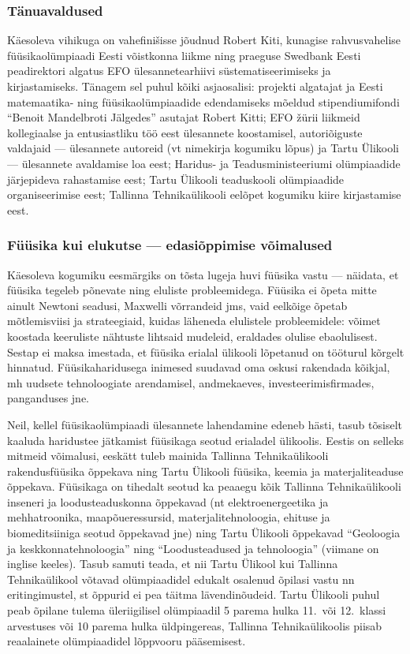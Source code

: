 \documentclass[11pt, twoside]{article}
\begin{document}
{{\subsubsection*{Tänuavaldused}
Käesoleva vihikuga on vahefinišisse jõudnud Robert Kiti, kunagise rahvusvahelise
füüsikaolümpiaadi Eesti võistkonna liikme ning
praeguse Swedbank Eesti peadirektori algatus EFO
ülesannetearhiivi süstematiseerimiseks ja kirjastamiseks.
Tänagem sel puhul kõiki asjaosalisi: projekti algatajat ja Eesti matemaatika- ning
füüsikaolümpiaadide edendamiseks mõeldud stipendiumifondi ``Benoit Mandelbroti Jälgedes'' asutajat Robert Kitti; EFO žürii liikmeid kollegiaalse ja entusiastliku töö eest ülesannete koostamisel,
autoriõiguste valdajaid --- ülesannete autoreid (vt nimekirja kogumiku lõpus) ja Tartu Ülikooli ---  ülesannete avaldamise loa eest;
Haridus- ja Teadusministeeriumi olümpiaadide järjepideva rahastamise eest; Tartu Ülikooli teaduskooli
olümpiaadide organiseerimise eest; Tallinna Tehnikaülikooli eelõpet
kogumiku kiire kirjastamise eest.

\subsubsection*{Füüsika kui elukutse --- edasiõppimise võimalused}
Käesoleva kogumiku eesmärgiks on tõsta lugeja huvi füüsika vastu --- näidata, et füüsika tegeleb põnevate ning
eluliste probleemidega. Füüsika ei õpeta mitte ainult Newtoni seadusi, Maxwelli võrrandeid jms, vaid eelkõige
õpetab mõtlemisviisi ja strateegiaid, kuidas läheneda elulistele probleemidele: võimet koostada keeruliste nähtuste
lihtsaid mudeleid, eraldades olulise ebaolulisest. Sestap ei maksa imestada, et
füüsika erialal ülikooli lõpetanud on tööturul kõrgelt hinnatud.
Füüsikaharidusega inimesed suudavad oma oskusi rakendada kõikjal, mh uudsete tehnoloogiate
arendamisel, andmekaeves, investeerimisfirmades, panganduses jne.

Neil, kellel füüsikaolümpiaadi ülesannete lahendamine edeneb hästi, tasub tõsiselt kaaluda haridustee jätkamist
füüsikaga seotud erialadel ülikoolis. Eestis on selleks mitmeid võimalusi, eeskätt tuleb mainida
{Tallinna Tehnikaülikooli rakendusfüüsika õppekava ning Tartu Ülikooli füüsika, keemia ja materjaliteaduse õppekava}.
Füüsikaga on tihedalt seotud ka peaaegu kõik
Tallinna Tehnikaülikooli inseneri ja loodusteaduskonna õppekavad (nt elektroenergeetika ja mehhatroonika, maapõueressursid,
materjalitehnoloogia, ehituse ja biomeditsiiniga seotud õppekavad jne) ning  Tartu Ülikooli õppekavad
``Geoloogia ja keskkonnatehnoloogia'' ning ``Loodusteadused ja tehnoloogia'' (viimane on inglise keeles).
Tasub samuti teada, et nii  Tartu Ülikool kui Tallinna Tehnikaülikool võtavad olümpiaadidel edukalt
osalenud õpilasi vastu nn eritingimustel, st õppurid ei pea täitma lävendinõudeid.
Tartu Ülikooli puhul peab õpilane tulema üleriigilisel olümpiaadil 5 parema hulka 11.\ või 12.\ klassi arvestuses või
10 parema hulka üldpingereas, Tallinna Tehnikaülikoolis piisab reaalainete olümpiaadidel lõppvooru pääsemisest.

}}
\end{document}
